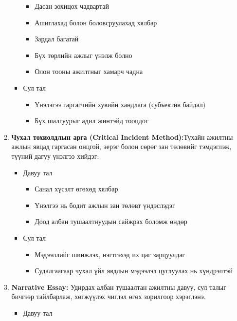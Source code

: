 \begin{enumerate}
\begin{enumerate}
\begin{itemize}
\begin{itemize}
                \item Дасан зохицох чадвартай
                \item Ашиглахад болон боловсруулахад хялбар
                \item Зардал багатай
                \item Бүх төрлийн ажлыг үнэлж болно
                \item Олон тооны ажилтныг хамарч чадна
            \end{itemize}
            \item Сул тал
            \begin{itemize}
                \item Үнэлэгээ гаргагчийн хувийн хандлага (субъектив байдал)
                \item Бүх шалгуурыг адил жинтэйд тооцдог
            \end{itemize}
        \end{itemize}
        \item \textbf{Чухал тохиолдлын арга (Critical Incident Method):}Тухайн ажилтны ажлын явцад гаргасан онцгой, 
        эерэг болон сөрөг зан төлөвийг тэмдэглэж, түүний дагуу үнэлгээ хийдэг.
        \begin{itemize}
            \item Давуу тал
            \begin{itemize}
                \item Санал хүсэлт өгөхөд хялбар
                \item Үнэлгээ нь бодит ажлын зан төлөвт үндэслэдэг
                \item Доод албан тушаалтнуудын сайжрах боломж өндөр
            \end{itemize}
            \item Сул тал
            \begin{itemize}
                \item Мэдээллийг шинжлэх, нэгтгэхэд их цаг зарцуулдаг
                \item Судалгаагаар чухал үйл явдлын мэдээлэл цуглуулах нь хүндрэлтэй
            \end{itemize}
        \end{itemize}
        \item \textbf{Narrative Essay:} Удирдах албан тушаалтан ажилтны давуу, сул талыг бичгээр тайлбарлаж, хөгжүүлэх чиглэл өгөх зорилгоор хэрэглэнэ.
        \begin{itemize}
            \item Давуу тал

\end{itemize}
\end{enumerate}
\end{enumerate}
